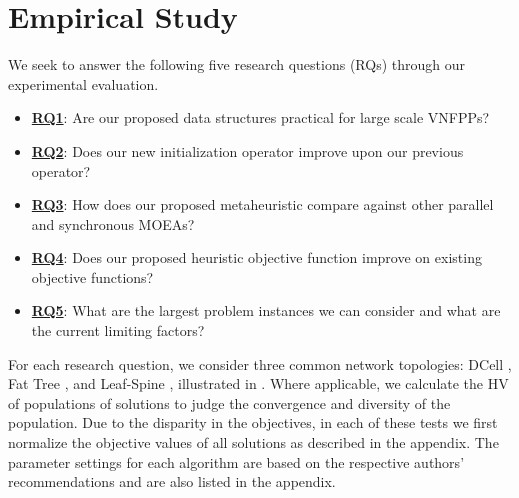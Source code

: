 \section{Empirical Study}
\label{sec:evaluation}
We seek to answer the following five research questions (RQs) through our experimental evaluation.
\begin{itemize}
    \item\underline{\textbf{RQ1}}: Are our proposed data structures practical for large scale VNFPPs?
    \item\underline{\textbf{RQ2}}: Does our new initialization operator improve upon our previous operator?
    \item\underline{\textbf{RQ3}}: How does our proposed metaheuristic compare against other parallel and synchronous MOEAs?
    \item\underline{\textbf{RQ4}}: Does our proposed heuristic objective function improve on existing objective functions?
    \item\underline{\textbf{RQ5}}: What are the largest problem instances we can consider and what are the current limiting factors?
\end{itemize}

For each research question, we consider three common network topologies: DCell \cite{GuoWTSZL08}, Fat Tree \cite{Al-FaresLV08}, and Leaf-Spine \cite{Cisco19}, illustrated in . Where applicable, we calculate the HV of populations of solutions to judge the convergence and diversity of the population. Due to the disparity in the objectives, in each of these tests we first normalize the objective values of all solutions as described in the appendix. The parameter settings for each algorithm are based on the respective authors' recommendations and are also listed in the appendix.


